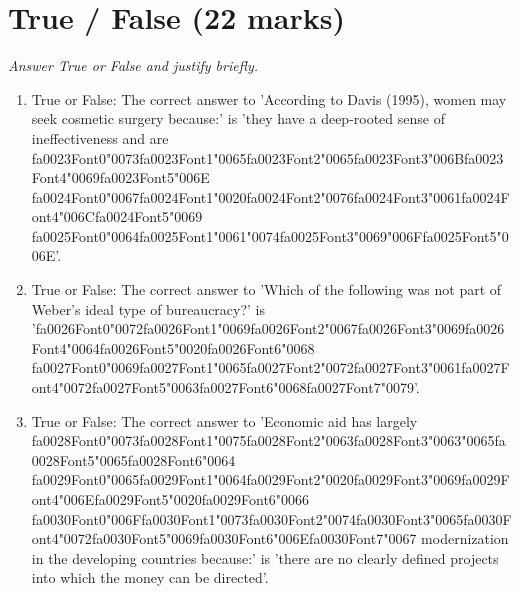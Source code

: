 \documentclass[12pt]{article}
\begin{document}
\section*{True / False (22 marks)}
\textit{Answer True or False and justify briefly.}
\begin{enumerate}[label=\arabic*.]
\item True or False: The correct answer to 'According to Davis (1995), women may seek cosmetic surgery because:' is 'they have a deep-rooted sense of ineffectiveness and are {\csname fa0023Font0\endcsname\char"0073}{\csname fa0023Font1\endcsname\char"0065}{\csname fa0023Font2\endcsname\char"0065}{\csname fa0023Font3\endcsname\char"006B}{\csname fa0023Font4\endcsname\char"0069}{\csname fa0023Font5\endcsname\char"006E} {\csname fa0024Font0\endcsname\char"0067}{\csname fa0024Font1\endcsname\char"0020}{\csname fa0024Font2\endcsname\char"0076}{\csname fa0024Font3\endcsname\char"0061}{\csname fa0024Font4\endcsname\char"006C}{\csname fa0024Font5\endcsname\char"0069} {\csname fa0025Font0\endcsname\char"0064}{\csname fa0025Font1\endcsname\char"0061}{\char"0074}{\csname fa0025Font3\endcsname\char"0069}{\char"006F}{\csname fa0025Font5\endcsname\char"006E}'.
\item True or False: The correct answer to 'Which of the following was not part of Weber's ideal type of bureaucracy?' is '{\csname fa0026Font0\endcsname\char"0072}{\csname fa0026Font1\endcsname\char"0069}{\csname fa0026Font2\endcsname\char"0067}{\csname fa0026Font3\endcsname\char"0069}{\csname fa0026Font4\endcsname\char"0064}{\csname fa0026Font5\endcsname\char"0020}{\csname fa0026Font6\endcsname\char"0068} {\csname fa0027Font0\endcsname\char"0069}{\csname fa0027Font1\endcsname\char"0065}{\csname fa0027Font2\endcsname\char"0072}{\csname fa0027Font3\endcsname\char"0061}{\csname fa0027Font4\endcsname\char"0072}{\csname fa0027Font5\endcsname\char"0063}{\csname fa0027Font6\endcsname\char"0068}{\csname fa0027Font7\endcsname\char"0079}'.
\item True or False: The correct answer to 'Economic aid has largely {\csname fa0028Font0\endcsname\char"0073}{\csname fa0028Font1\endcsname\char"0075}{\csname fa0028Font2\endcsname\char"0063}{\csname fa0028Font3\endcsname\char"0063}{\char"0065}{\csname fa0028Font5\endcsname\char"0065}{\csname fa0028Font6\endcsname\char"0064} {\csname fa0029Font0\endcsname\char"0065}{\csname fa0029Font1\endcsname\char"0064}{\csname fa0029Font2\endcsname\char"0020}{\csname fa0029Font3\endcsname\char"0069}{\csname fa0029Font4\endcsname\char"006E}{\csname fa0029Font5\endcsname\char"0020}{\csname fa0029Font6\endcsname\char"0066} {\csname fa0030Font0\endcsname\char"006F}{\csname fa0030Font1\endcsname\char"0073}{\csname fa0030Font2\endcsname\char"0074}{\csname fa0030Font3\endcsname\char"0065}{\csname fa0030Font4\endcsname\char"0072}{\csname fa0030Font5\endcsname\char"0069}{\csname fa0030Font6\endcsname\char"006E}{\csname fa0030Font7\endcsname\char"0067} modernization in the developing countries because:' is 'there are no clearly defined projects into which the money can be directed'.

\end{enumerate}
\end{document}
